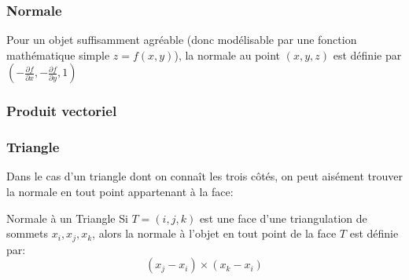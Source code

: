 \documentclass{beamercours}
\begin{document}
\begin{frame}
\frametitle{Normale}
\begin{remarque}{}{}
	Pour un objet suffisamment agréable (donc modélisable par une fonction mathématique simple $z = f(x, y)$), la normale au point $(x, y, z)$ est définie par $(-\frac{\partial{f}}{\partial{x}}, -\frac{\partial{f}}{\partial{y}}, 1)$
\end{remarque}
\end{frame}
\begin{frame}
\frametitle{Produit vectoriel}

\end{frame}

\begin{frame}
\frametitle{Triangle}
Dans le cas d'un triangle dont on connaît les trois côtés, on peut aisément trouver la normale en tout point appartenant à la face:
\begin{propositionfr}{Normale à un Triangle}{}
	Si $T = (i, j, k)$ est une face d'une triangulation de sommets $x_{i}, x_{j}, x_{k}$, alors la normale à l'objet en tout point de la face $T$ est définie par:
	\begin{equation*}
		(x_{j} - x_{i}) \times (x_{k} - x_{i})
	\end{equation*}
\end{propositionfr}
\end{frame}
\end{document}
